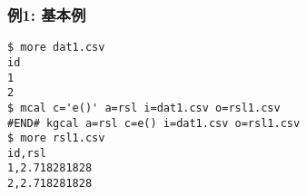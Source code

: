 \subsubsection*{例1: 基本例}



\begin{Verbatim}[baselinestretch=0.7,frame=single]
$ more dat1.csv
id
1
2
$ mcal c='e()' a=rsl i=dat1.csv o=rsl1.csv
#END# kgcal a=rsl c=e() i=dat1.csv o=rsl1.csv
$ more rsl1.csv
id,rsl
1,2.718281828
2,2.718281828
\end{Verbatim}
